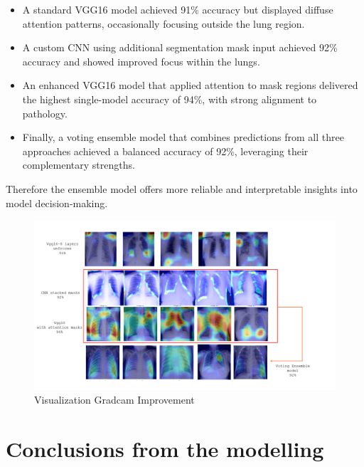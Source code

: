 \documentclass{article}
\begin{document}
\begin{itemize}
    \item A standard VGG16 model achieved 91\% accuracy but displayed diffuse attention patterns, occasionally focusing outside the lung region.
    \item A custom CNN using additional segmentation mask input achieved 92\% accuracy and showed improved focus within the lungs.
    \item An enhanced VGG16 model that applied attention to mask regions delivered the highest single-model accuracy of 94\%, with strong alignment to pathology.
     \item Finally, a voting ensemble model that combines predictions from all three approaches achieved a balanced accuracy of 92\%, leveraging their complementary strengths.
\end{itemize}

Therefore the ensemble model offers more reliable and interpretable insights into model decision-making.

\begin{figure}%
    \centering
    \includegraphics[width=1.0\linewidth]{gradcam_final.png}
    \caption{Visualization Gradcam Improvement}
    \label{fig:Visualization of Gradcam}
\end{figure}




\section{Conclusions from the modelling}
\end{document}
